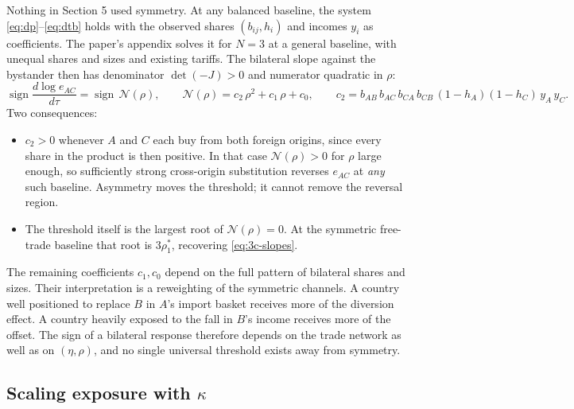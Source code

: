 \documentclass[11pt]{article}
\begin{document}
Nothing in Section 5 used symmetry. At any balanced baseline, the system \eqref{eq:dp}--\eqref{eq:dtb} holds with the observed shares $(b_{ij}, h_i)$ and incomes $y_i$ as coefficients. The paper's appendix solves it for $N = 3$ at a general baseline, with unequal shares and sizes and existing tariffs. The bilateral slope against the bystander then has denominator $\det(-J) > 0$ and numerator quadratic in $\rho$:
\begin{equation}
\operatorname{sign} \frac{d\log e_{AC}}{d\tau}
= \operatorname{sign}\, \mathcal{N}(\rho),
\qquad
\mathcal{N}(\rho) = c_2\, \rho^2 + c_1\, \rho + c_0,
\qquad
c_2 = b_{AB}\, b_{AC}\, b_{CA}\, b_{CB}\, (1-h_A)(1-h_C)\, y_A\, y_C .
\label{eq:asym-quad}
\end{equation}
Two consequences:
\begin{itemize}
\item $c_2 > 0$ whenever $A$ and $C$ each buy from both foreign origins, since every share in the product is then positive. In that case $\mathcal{N}(\rho) > 0$ for $\rho$ large enough, so sufficiently strong cross-origin substitution reverses $e_{AC}$ at \emph{any} such baseline. Asymmetry moves the threshold; it cannot remove the reversal region.
\item The threshold itself is the largest root of $\mathcal{N}(\rho) = 0$. At the symmetric free-trade baseline that root is $3\rho_1^*$, recovering \eqref{eq:3c-slopes}.
\end{itemize}
The remaining coefficients $c_1, c_0$ depend on the full pattern of bilateral shares and sizes. Their interpretation is a reweighting of the symmetric channels. A country well positioned to replace $B$ in $A$'s import basket receives more of the diversion effect. A country heavily exposed to the fall in $B$'s income receives more of the offset. The sign of a bilateral response therefore depends on the trade network as well as on $(\eta, \rho)$, and no single universal threshold exists away from symmetry.

\subsection{Scaling exposure with $\kappa$}
\end{document}
